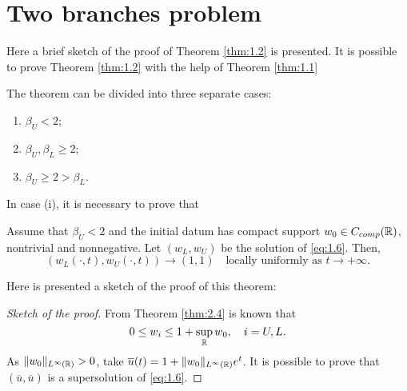 \section{Two branches problem} 
Here a brief sketch of the proof of Theorem \ref{thm:1.2} is presented. It is possible to prove Theorem \ref{thm:1.2} with the help of Theorem \ref{thm:1.1}

The theorem can be divided into three separate cases:
\begin{enumerate}[label=(\roman*)]
    \item \(\beta_U < 2\);
    \item \(\beta_U, \beta_L \geq 2\);
    \item \(\beta_U \geq 2 > \beta_L\).
\end{enumerate}
In case (i), it is necessary to prove that
\begin{theorem}
    Assume that \(\beta_U < 2\) and the initial datum has compact support \(w_{0} \in C_{comp}(\mathbb{R})\), nontrivial and nonnegative. Let \((w_L, w_{U})\) be the solution of \eqref{eq:1.6}. Then,
    \[
        (w_L(\cdot, t), w_{U}(\cdot, t)) \to (1, 1) \quad \text{locally uniformly as } t \to +\infty.
    \]
    \label{thm:3.1}
\end{theorem}
Here is presented a sketch of the proof of this theorem:
\begin{proof}[Sketch of the proof]
    From Theorem \ref{thm:2.4} is known that 
    \begin{equation}
        0 \leq w_{i} \leq 1 + \sup_{\mathbb{R}} w_{0}, \quad i = U, L.
        \label{eq:3.2}
    \end{equation}
    As \(\lVert w_{0}\rVert_{L^{\infty}(\mathbb{R})} > 0\), take \(\overline{u}(t) = 1 + \lVert w_{0}\rVert_{L^{\infty}(\mathbb{R})}e^{t}\). 
    It is possible to prove that \((\overline{u}, \overline{u})\) is a supersolution of \eqref{eq:1.6}.
\end{proof}